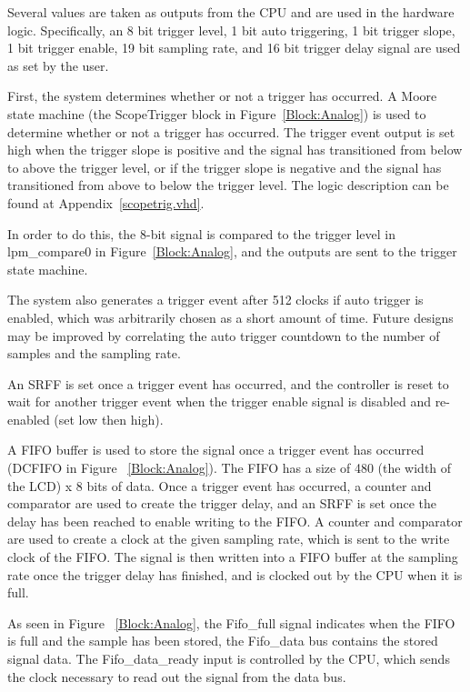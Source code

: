 \documentclass[12pt]{refart} %
\begin{document}
Several values are taken as outputs from the CPU and are used in the hardware logic. Specifically, an 8 bit trigger level, 1 bit auto triggering, 1 bit trigger slope, 1 bit trigger enable, 19 bit sampling rate, and 16 bit trigger delay signal are used as set by the user. 

 
First, the system determines whether or not a trigger has occurred.
A Moore state machine (the ScopeTrigger block in Figure~\ref{Block:Analog}) is used to determine whether or not a trigger has occurred. The trigger event output is set high when the trigger slope is positive and the signal has transitioned from below to above the trigger level, or if the trigger slope is negative and the signal has transitioned from above to below the trigger level. The logic description can be found at Appendix~\ref{scopetrig.vhd}.%

In order to do this, the 8-bit signal is compared to the trigger level in lpm\_compare0 in Figure~\ref{Block:Analog}, and the outputs are sent to the trigger state machine.

 The system also generates a trigger event after 512 clocks if auto trigger is enabled, which was arbitrarily chosen as a short amount of time. Future designs may be improved by correlating the auto trigger countdown to the number of samples and the sampling rate.

An SRFF is set once a trigger event has occurred, and the controller is reset to wait for another trigger event when the trigger enable signal is disabled and re-enabled (set low then high).  

  A FIFO buffer is used to store the signal once a trigger event has occurred (DCFIFO in Figure ~\ref{Block:Analog}). The FIFO has a size of 480 (the width of the LCD) x 8 bits of data. Once a trigger event has occurred, a counter and comparator are used to create the trigger delay, and an SRFF is set once the delay has been reached to enable writing to the FIFO. A counter and comparator are used to create a clock at the given sampling rate, which is sent to the write clock of the FIFO. The signal is then written into a FIFO buffer at the sampling rate once the trigger delay has finished, and is clocked out by the CPU when it is full. 

 As seen in Figure ~\ref{Block:Analog}, the Fifo\_full signal indicates when the FIFO is full and the sample has been stored, the Fifo\_data bus contains the stored signal data. The Fifo\_data\_ready input is controlled by the CPU, which sends the clock necessary to read out the signal from the data bus.
\end{document}
